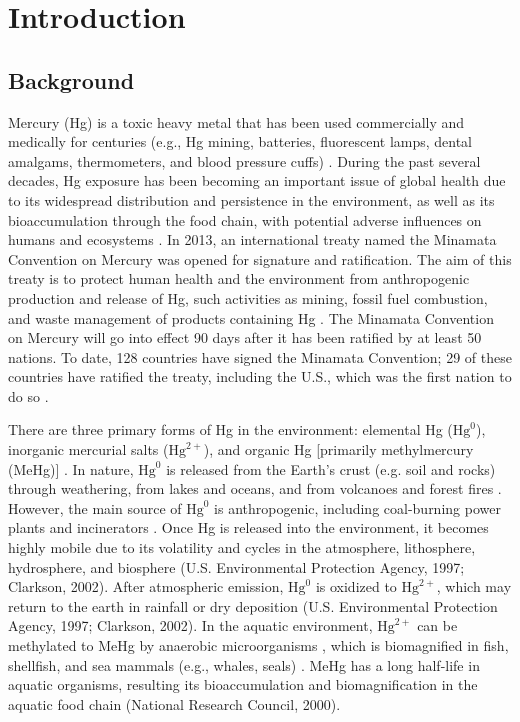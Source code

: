 \chapter{Introduction}

\section{Background}

Mercury (Hg) is a toxic heavy metal that has been used commercially and medically for centuries (e.g., Hg mining, batteries, fluorescent lamps, dental amalgams, thermometers, and blood pressure cuffs) \citep{who1990mehg,usepa1997hgcongress,clarkson2006toxicology}. During the past several decades, Hg exposure has been becoming an important issue of global health due to its widespread distribution and persistence in the environment, as well as its bioaccumulation through the food chain, with potential adverse influences on humans and ecosystems \citep{who1990mehg,national2000toxicological,clarkson2003toxicology}. In 2013, an international treaty named the Minamata Convention on Mercury was opened for signature and ratification. The aim of this treaty is to protect human health and the environment from anthropogenic production and release of Hg, such activities as mining, fossil fuel combustion, and waste management of products containing Hg \citep{unep2016mcm}. The Minamata Convention on Mercury will go into effect 90 days after it has been ratified by at least 50 nations. To date, 128 countries have signed the Minamata Convention; 29 of these countries have ratified the treaty, including the U.S., which was the first nation to do so \citep{unep2016mcm}.

There are three primary forms of Hg in the environment: elemental Hg (\(\text{Hg}^{0}\)), inorganic mercurial salts (\(\text{Hg}^{2+}\)), and organic Hg [primarily methylmercury (MeHg)]  \citep{usepa1997hgcongress,clarkson2002three}. In nature, \(\text{Hg}^{0}\) is released from the Earth's crust (e.g. soil and rocks) through weathering, from lakes and oceans, and from volcanoes and forest fires \citep{usepa1997hgcongress,clarkson2002three}. However, the main source of \(\text{Hg}^{0}\) is anthropogenic, including coal-burning power plants and incinerators \citep{mason1994biogeochemical}. Once Hg is released into the environment, it becomes highly mobile due to its volatility and cycles in the atmosphere, lithosphere, hydrosphere, and biosphere (U.S. Environmental Protection Agency, 1997; Clarkson, 2002). After atmospheric emission, \(\text{Hg}^0\) is oxidized to \(\text{Hg}^{2+}\), which may return to the earth in rainfall or dry deposition (U.S. Environmental Protection Agency, 1997; Clarkson, 2002). In the aquatic environment, \(\text{Hg}^{2+}\) can be methylated to MeHg by anaerobic microorganisms \citep{parks2013genetic}, which is biomagnified in fish, shellfish, and sea mammals (e.g., whales, seals) \citep{morel1998chemical}. MeHg has a long half-life in aquatic organisms, resulting its bioaccumulation and biomagnification in the aquatic food chain (National Research Council, 2000). 

